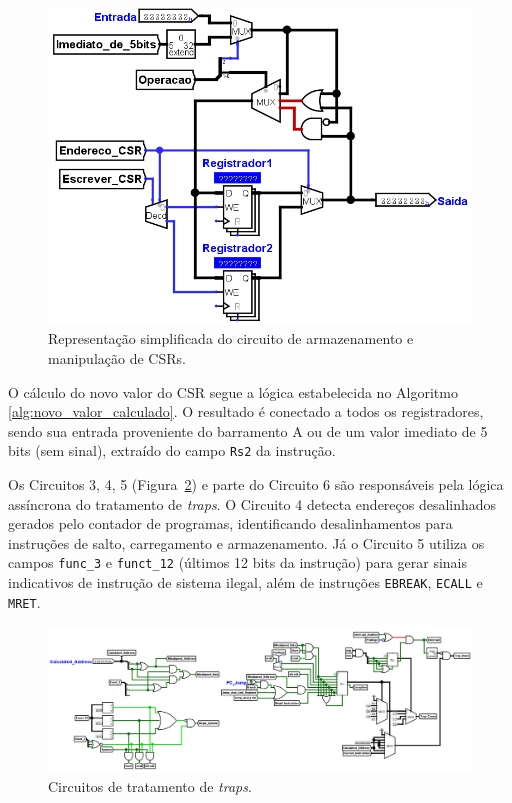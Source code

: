 \documentclass[
	12pt,				%
	openright,			%
	oneside,			%
	a4paper,			%
	english,			%
	french,				%
	spanish,			%
	brazil,				%
	]{abntex2}
\begin{document}
\begin{figure}[h]
    \centering
    \includegraphics[width=0.75\linewidth]{ProcessoDesenvolvimento/Arquitetura/CSR_2.png}
    \caption{Representação simplificada do circuito de armazenamento e manipulação de CSRs.}
    \label{fig:CSR_2}
\end{figure}

O cálculo do novo valor do CSR segue a lógica estabelecida no Algoritmo \ref{alg:novo_valor_calculado}. O resultado é conectado a todos os registradores, sendo sua entrada proveniente do barramento A ou de um valor imediato de 5 bits (sem sinal), extraído do campo \texttt{Rs2} da instrução.

Os Circuitos 3, 4, 5 (Figura~\ref{fig:CSR_3_4_5}) e parte do Circuito 6 são responsáveis pela lógica assíncrona do tratamento de \textit{traps}. O Circuito 4 detecta endereços desalinhados gerados pelo contador de programas, identificando desalinhamentos para instruções de salto, carregamento e armazenamento. Já o Circuito 5 utiliza os campos \texttt{func\_3} e \texttt{funct\_12} (últimos 12 bits da instrução) para gerar sinais indicativos de instrução de sistema ilegal, além de instruções \texttt{EBREAK}, \texttt{ECALL} e \texttt{MRET}.

\begin{figure}[h]
    \centering
    \includegraphics[width=1\linewidth]{ProcessoDesenvolvimento/Arquitetura/CSR_3_4_5_6.png}
    \caption{Circuitos de tratamento de \textit{traps}.}
    \label{fig:CSR_3_4_5}
\end{figure}
\end{document}
